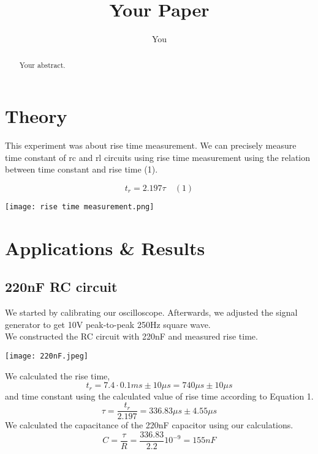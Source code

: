 \documentclass{article}
\title{Your Paper}
\author{You}
\begin{document}
\maketitle

\begin{abstract}
Your abstract.
\end{abstract}

\section{Theory}

This experiment was about rise time measurement. We can precisely measure time constant of rc and rl circuits using rise time measurement using the relation between time constant and rise time (1).

\[t_r = 2.197\tau \quad (1) \] 

\begin{center}
    \texttt{[image: rise time measurement.png]}
    \label{fig:centered-figure}
\end{center}

\newpage
\section{Applications \& Results}

\subsection{220nF RC circuit}
We started by calibrating our oscilloscope. Afterwards, we adjusted the signal generator to get 10V peak-to-peak 250Hz square wave.\\

We constructed the RC circuit with 220nF and measured rise time.

\begin{center}
    \texttt{[image: 220nF.jpeg]}
    \label{fig:centered-figure}
\end{center}

We calculated the rise time,
\[t_r = 7.4 \cdot 0.1ms \pm 10\mu s = 740\mu s \pm 10\mu s\]
and time constant using the calculated value of rise time according to Equation 1.
\[\tau = \frac{t_r}{2.197} = 336.83\mu s \pm 4.55\mu s \]
We calculated the capacitance of the 220nF capacitor using our calculations.
\[C = \frac{\tau}{R} = \frac{336.83}{2.2}10^{-9} = 155nF\]
\end{document}
